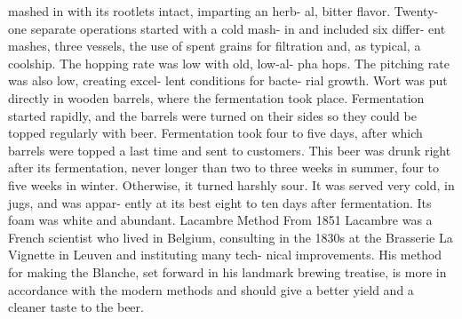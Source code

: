 \documentclass[a4paper,parskip=half]{scrartcl}
\begin{document}
mashed in with its rootlets
intact, imparting an herb-
al, bitter flavor. Twenty-
one separate operations
started with a cold mash-
in and included six differ-
ent mashes, three vessels,
the use of spent grains for
filtration and, as typical, a
coolship. The hopping rate
was low with old, low-al-
pha hops.
The pitching rate was
also low, creating excel-
lent conditions for bacte-
rial growth. Wort was put
directly in wooden barrels,
where the fermentation
took place. Fermentation
started rapidly, and the
barrels were turned on
their sides so they could
be topped regularly with beer. Fermentation took four to five days, after
which barrels were topped a last time and sent to customers.
This beer was drunk right after its fermentation, never longer than
two to three weeks in summer, four to five weeks in winter. Otherwise,
it turned harshly sour. It was served very cold, in jugs, and was appar-
ently at its best eight to ten days after fermentation. Its foam was white
and abundant.
Lacambre Method
From 1851
Lacambre was a French scientist who lived in Belgium, consulting in the
1830s at the Brasserie La Vignette in Leuven and instituting many tech-
nical improvements. His method for making the Blanche, set forward in
his landmark brewing treatise, is more in accordance with the modern
methods and should give a better yield and a cleaner taste to the beer.

\parencite[42]{Hieronymus2010}
\end{document}
